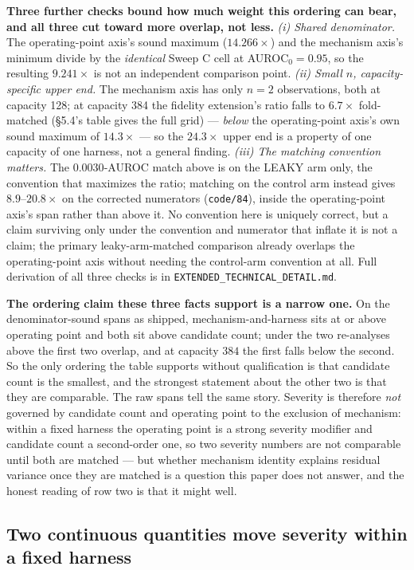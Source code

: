 \documentclass[10pt]{article} %
\begin{document}
\textbf{Three further checks bound how much weight this ordering can bear, and
all three cut toward more overlap, not less.} \emph{(i) Shared denominator.}
The operating-point axis's sound maximum ($14.266\times$) and the mechanism
axis's minimum divide by the \emph{identical} Sweep C cell at AUROC$_0=0.95$,
so the resulting $9.241\times$ is not an independent comparison point.
\emph{(ii) Small $n$, capacity-specific upper end.} The mechanism axis has
only $n=2$ observations, both at capacity 128; at capacity 384 the fidelity
extension's ratio falls to $6.7\times$ fold-matched (§5.4's table gives the
full grid) --- \emph{below} the operating-point axis's own sound maximum of
$14.3\times$ --- so the $24.3\times$ upper end is a property of one capacity
of one harness, not a general finding. \emph{(iii) The matching convention
matters.} The $0.0030$-AUROC match above is on the LEAKY arm only, the
convention that maximizes the ratio; matching on the control arm instead
gives $\mathbf{8.9}$--$\mathbf{20.8\times}$ on the corrected numerators
(\texttt{code/84}), inside the operating-point axis's span rather than above
it. No convention here is uniquely correct, but a claim surviving only under
the convention and numerator that inflate it is not a claim; the primary
leaky-arm-matched comparison already overlaps the operating-point axis
without needing the control-arm convention at all. Full derivation of all
three checks is in \texttt{EXTENDED\_TECHNICAL\_DETAIL.md}.

\textbf{The ordering claim these three facts support is a narrow one.} On the
denominator-sound spans as shipped, mechanism-and-harness sits at or above
operating point and both sit above candidate count; under the two re-analyses
above the first two overlap, and at capacity $384$ the first falls below the
second. So the only ordering the table supports without qualification is that
candidate count is the smallest, and the strongest statement about the other
two is that they are comparable. The raw spans tell the same story. Severity is
therefore \emph{not} governed by candidate count and operating point to the
exclusion of mechanism: within a fixed harness the operating point is a strong
severity modifier and candidate count a second-order one, so two severity
numbers are not comparable until both are matched --- but whether mechanism
identity explains residual variance once they are matched is a question this
paper does not answer, and the honest reading of row two is that it might well.

\subsection{Two continuous quantities move severity within a fixed harness}
\end{document}
